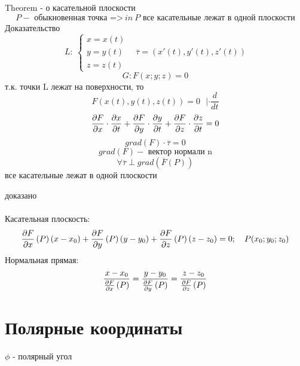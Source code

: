 \documentclass{article}
\begin{document}
Theorem  - о касательной плоскости 
\begin{equation*}
    P - \text{ обыкновенная точка =>}\ in\ P \text{ все касательные лежат в одной плоскости}
\end{equation*}
Доказательство
\begin{equation*}
    L:\ 
    \begin{cases}
        x = x(t)\\
        y = y(t)\\
        z = z(t)
    \end{cases} \ \ \ \ 
    \overline{\tau} = (x'(t), y'(t), z'(t))
\end{equation*}
\begin{equation*}
    G: F(x;y;z) = 0
\end{equation*}
т.к. точки L лежат на поверхности, то 
\begin{equation*}
    F(x(t), y(t), z(t)) = 0\ \ \ | \cdot \frac{d}{dt}
\end{equation*}
\begin{equation*}
    \pdv{F}{x}\cdot \pdv{x}{t} + \pdv{F}{y}\cdot \pdv{y}{t} + \pdv{F}{z}\cdot \pdv{z}{t} = 0
\end{equation*}
\begin{equation*}
    grad(F)\cdot \overline{\tau} = 0
\end{equation*}
\begin{equation*}
    grad(F) - \text{ вектор нормали n}
\end{equation*}
\begin{equation*}
    \forall \overline{\tau} \perp grad(\overline{F}(P))
\end{equation*}
все касательные лежат в одной плоскости 

доказано
\\  \\
Касательная плоскость:
\begin{equation*}
    \pdv{F}{x}\left(P\right)(x-x_0)+\pdv{F}{y}\left(P\right)(y - y_0) +\pdv{F}{z}\left(P\right)(z - z_0) = 0; \ \ \  P(x_0;y_0;z_0)
\end{equation*}
Нормальная прямая:
\begin{equation*}
    \frac{x-x_0}{\pdv{F}{x}\left(P\right)} = \frac{y-y_0}{\pdv{F}{y}\left(P\right)} = \frac{z-z_0}{\pdv{F}{z}\left(P\right)}
\end{equation*}

\section{Полярные координаты}
$\phi$ - полярный угол 
\end{document}
